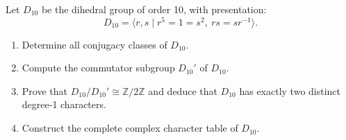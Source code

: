 \begin{prob}[F2000-Q7]
    Let \( D_{10} \) be the dihedral group of order 10, with presentation:
    \[
    D_{10} = \langle r, s \mid r^5 = 1 = s^2,\ rs = sr^{-1} \rangle.
    \]
    
    \begin{enumerate}
        \item Determine all conjugacy classes of \( D_{10} \).
        
        \item Compute the commutator subgroup \( D_{10}' \) of \( D_{10} \).
        
        \item Prove that \( D_{10}/D_{10}' \cong \mathbb{Z}/2\mathbb{Z} \) and deduce that \( D_{10} \) has exactly two distinct degree-1 characters.
        
        \item Construct the complete complex character table of \( D_{10} \).
    \end{enumerate}
\end{prob}



















